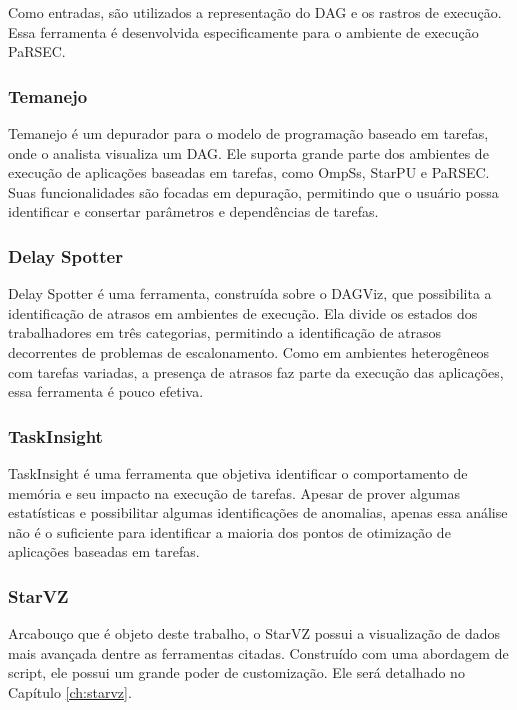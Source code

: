 Como entradas, são utilizados a representação do DAG e os rastros de 
execução. Essa ferramenta é desenvolvida especificamente para o 
ambiente de execução PaRSEC.

\subsubsection*{Temanejo}

Temanejo \cite{ref:temanejo} é um depurador para o modelo de 
programação baseado em tarefas, onde o analista visualiza um DAG. Ele suporta 
grande parte dos ambientes de execução de aplicações baseadas em tarefas, como 
OmpSs, StarPU e PaRSEC. Suas funcionalidades são focadas em depuração, 
permitindo que o usuário possa identificar e consertar parâmetros e dependências 
de tarefas.

\subsubsection*{Delay Spotter}

Delay Spotter \cite{ref:delayspotter} é uma ferramenta, construída sobre o 
DAGViz, que possibilita a identificação de atrasos em ambientes 
de execução. Ela divide os estados dos trabalhadores em três categorias, 
permitindo a identificação de atrasos decorrentes de problemas de 
escalonamento. Como em ambientes heterogêneos com tarefas variadas, a presença 
de atrasos faz parte da execução das aplicações, essa ferramenta é 
pouco efetiva.

\subsubsection*{TaskInsight}

TaskInsight \cite{ref:taskinsight} é uma ferramenta que objetiva identificar o 
comportamento de memória e seu impacto na execução de tarefas. Apesar de prover 
algumas estatísticas e possibilitar algumas identificações de anomalias, apenas 
essa análise não é o suficiente para identificar a maioria dos pontos de 
otimização de aplicações baseadas em tarefas.

\subsubsection*{StarVZ}

Arcabouço que é objeto deste trabalho, o StarVZ \cite{ref:starvz} possui 
a visualização de dados mais avançada dentre as ferramentas citadas. Construído 
com uma abordagem de script, ele possui um grande poder de 
customização. Ele será detalhado no Capítulo \ref{ch:starvz}.

